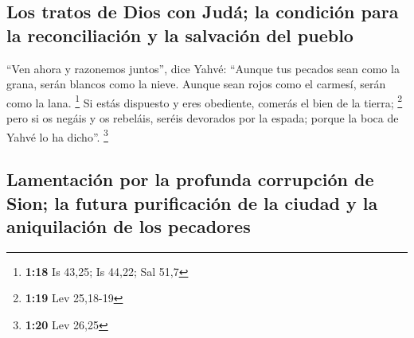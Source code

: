 \begin{paracol}{2}
\hypertarget{los-tratos-de-dios-con-juduxe1-la-condiciuxf3n-para-la-reconciliaciuxf3n-y-la-salvaciuxf3n-del-pueblo}{%
\subsection{Los tratos de Dios con Judá; la condición para la
reconciliación y la salvación del
pueblo}\label{los-tratos-de-dios-con-juduxe1-la-condiciuxf3n-para-la-reconciliaciuxf3n-y-la-salvaciuxf3n-del-pueblo}}

 ``Ven ahora y razonemos juntos'', dice Yahvé: ``Aunque
tus pecados sean como la grana, serán blancos como la nieve. Aunque sean
rojos como el carmesí, serán como la lana. \footnote{\textbf{1:18} Is
  43,25; Is 44,22; Sal 51,7}  Si estás dispuesto y eres
obediente, comerás el bien de la tierra; \footnote{\textbf{1:19} Lev
  25,18-19}  pero si os negáis y os rebeláis, seréis
devorados por la espada; porque la boca de Yahvé lo ha dicho''.
\footnote{\textbf{1:20} Lev 26,25}

\hypertarget{lamentaciuxf3n-por-la-profunda-corrupciuxf3n-de-sion-la-futura-purificaciuxf3n-de-la-ciudad-y-la-aniquilaciuxf3n-de-los-pecadores}{%
\subsection{Lamentación por la profunda corrupción de Sion; la futura
purificación de la ciudad y la aniquilación de los
pecadores}\label{lamentaciuxf3n-por-la-profunda-corrupciuxf3n-de-sion-la-futura-purificaciuxf3n-de-la-ciudad-y-la-aniquilaciuxf3n-de-los-pecadores}}


\end{paracol}
